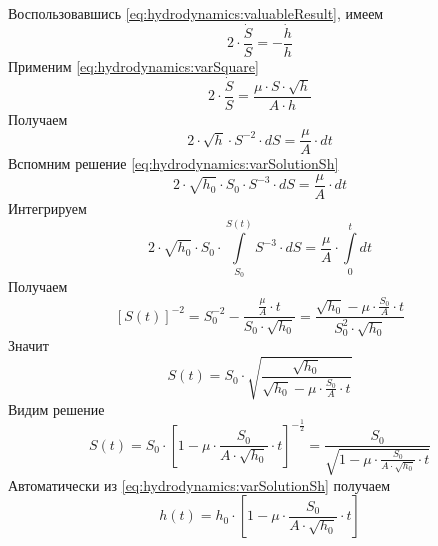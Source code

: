 Воспользовавшись \eqref{eq:hydrodynamics:valuableResult}, имеем
\begin{equation*}
  2 \cdot \frac{\dot{S}}{S}
  = - \frac{\dot{h}}{h}
\end{equation*}
Применим \eqref{eq:hydrodynamics:varSquare}
\begin{equation*}
  2 \cdot \frac{\dot{S}}{S}
  = \frac{\mu \cdot S \cdot \sqrt{h}}{A \cdot h}
\end{equation*}
Получаем
\begin{equation*}
  2 \cdot \sqrt{h}
    \cdot S^{-2} \cdot dS
  = \frac{\mu}{A} \cdot dt
\end{equation*}
Вспомним решение \eqref{eq:hydrodynamics:varSolutionSh}
\begin{equation*}
  2 \cdot \sqrt{h_0} \cdot S_0
    \cdot S^{-3} \cdot dS
  = \frac{\mu}{A} \cdot dt
\end{equation*}
Интегрируем
\begin{equation*}
  2 \cdot \sqrt{h_0} \cdot S_0
    \cdot \int\limits_{S_0}^{S\left( t \right)}
      S^{-3} \cdot dS
  = \frac{\mu}{A} \cdot \int\limits_{0}^{t} dt
\end{equation*}
Получаем
\begin{equation*}
  \left[ S\left( t \right) \right]^{-2}
  = S_0^{-2}
    - \frac{\frac{\mu}{A} \cdot t}{S_0 \cdot \sqrt{h_0}}
  =  \frac{\sqrt{h_0} - \mu \cdot \frac{S_0}{A} \cdot t}{
      S_0^2 \cdot \sqrt{h_0}}
\end{equation*}
Значит
\begin{equation*}
  S\left( t \right)
  = S_0 \cdot \sqrt{\frac{\sqrt{h_0}}{
      \sqrt{h_0} - \mu
        \cdot \frac{S_0}{A} \cdot t}}
\end{equation*}
Видим решение
\begin{equation*}
  S\left( t \right)
  = S_0
    \cdot \left[ 1 - \mu
      \cdot \frac{S_0}{A \cdot \sqrt{h_0}} \cdot t\right]^{-\frac{1}{2}}
  = \frac{S_0}{\sqrt{1 - \mu
      \cdot \frac{S_0}{A \cdot \sqrt{h_0}} \cdot t}}
\end{equation*}
Автоматически из \eqref{eq:hydrodynamics:varSolutionSh} получаем
\begin{equation*}
  h\left( t \right)
  = h_0 \cdot \left[ 1 - \mu
      \cdot \frac{S_0}{A \cdot \sqrt{h_0}} \cdot t\right]
\end{equation*}
